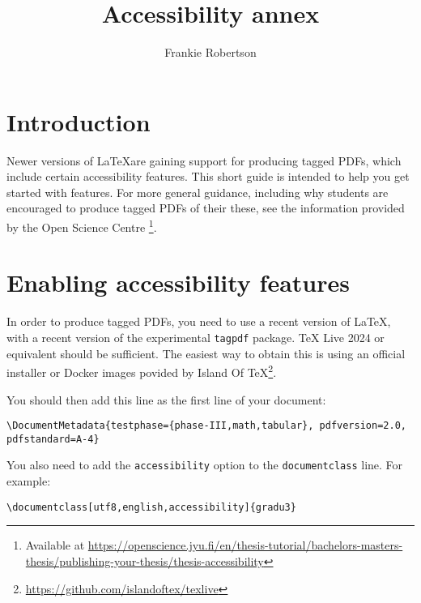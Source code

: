 \documentclass[utf8,english,accessibility]{gradu3}
\begin{document}
\title{Accessibility annex}

\author{Frankie Robertson}

\maketitle

\mainmatter

\chapter{Introduction}

Newer versions of \LaTeX are gaining support for producing tagged PDFs, which
include certain accessibility features. This short guide is intended to help
you get started with features. For more general guidance, including why
students are encouraged to produce tagged PDFs of their these, see the
information provided by the Open Science
Centre
\footnote{Available at \url{https://openscience.jyu.fi/en/thesis-tutorial/bachelors-masters-thesis/publishing-your-thesis/thesis-accessibility}}.

\chapter{Enabling accessibility features}

In order to produce tagged PDFs, you need to use a recent version of \LaTeX,
with a recent version of the experimental \texttt{tagpdf} package. TeX Live
2024 or equivalent should be sufficient. The easiest way to obtain this is
using an official installer or Docker images povided by Island Of
TeX\footnote{\url{https://github.com/islandoftex/texlive}}.

You should then add this line as the first line of your document:

\begingroup\footnotesize
\begin{verbatim}
\DocumentMetadata{testphase={phase-III,math,tabular}, pdfversion=2.0, pdfstandard=A-4}
\end{verbatim}
\endgroup

You also need to add the \texttt{accessibility} option to the \texttt{documentclass} line. For example:

\begingroup\footnotesize
\begin{verbatim}
\documentclass[utf8,english,accessibility]{gradu3}
\end{verbatim}
\endgroup
\end{document}
